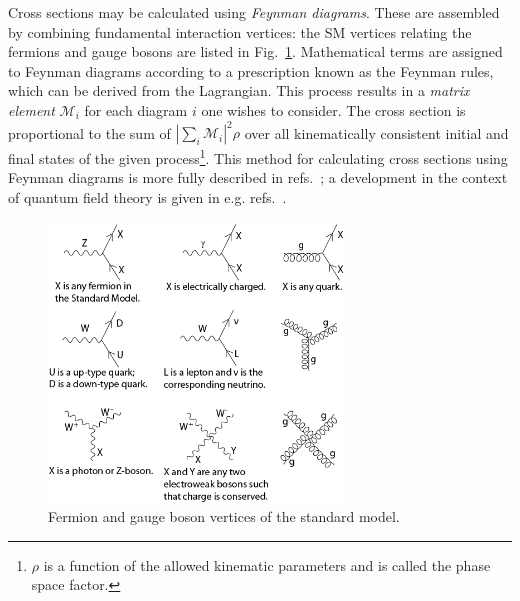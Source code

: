 \documentclass[oneside, letterpaper, 12pt, oldfontcommands]{memoir}
\begin{document}
Cross sections may be calculated using \textit{Feynman diagrams}. These are
assembled by combining fundamental interaction vertices: the SM vertices relating the fermions and gauge bosons are listed in Fig.~\ref{fig:sm_vertices}.
Mathematical terms are assigned to Feynman diagrams according to a prescription known as the Feynman rules, which can be derived from the Lagrangian.
This process results in a \textit{matrix element} $\mathcal{M}_{i}$ for each diagram $i$ one wishes to consider. The cross section is proportional to the sum of $|\sum_{i}{\mathcal{M}_{i}}|^{2}\rho$
over all kinematically consistent initial and final states of the given process\footnote{$\rho$ is a function of the allowed kinematic parameters and is called the phase space
factor.}. This method for calculating cross sections using Feynman diagrams is more fully described in refs.~\cite{ref:HalzenMartin, ref:BargerPhillips};
a development in the context of quantum field theory is given in e.g. refs.~\cite{ref:PeskinSchroeder, ref:Srednicki, ref:Schwartz}.

\begin{figure}[hbtp]
  \begin{center}
    \includegraphics[width=0.7\textwidth]{Figures/Standard_Model_Feynman_Diagram_Vertices.png}
    \caption{
      Fermion and gauge boson vertices of the standard model.
    }
    \label{fig:sm_vertices}
  \end{center}
\end{figure}
\end{document}
